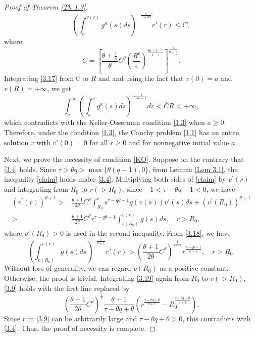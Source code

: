 \documentclass[a4paper,11pt]{amsart}
\theoremstyle{plain}
\theoremstyle{remark}
\numberwithin{equation}{section}
\numberwithin{figure}{section}
\numberwithin{remark}{section}
\begin{document}
\begin{sloppypar}
\begin{proof}[Proof of Theorem \ref{Th 1.3}]
\begin{equation}\label{3.17}
\left( \int_a^{v(r)} g^{\kappa} (s)ds\right)^{-\frac{1}{1+\kappa \theta}} v'(r) \le \bar C,
\end{equation}
where 
$$
\bar C = \left [ \frac{\theta +\frac{1}{\kappa}}{\theta} C^\theta \left (\frac{R^\epsilon}{\epsilon} \right)^{\frac{\theta q +1-\tau}{1-\epsilon}}  \right ]^{\frac{1}{\theta + \frac{1}{\kappa}}}.
$$
Integrating \eqref{3.17}  from $0$ to $R$ and and using the fact that $v(0)=a$ and $v(R)=+\infty$, we get
\begin{equation*}
	\int_{a}^{\infty}\left( \int_{a}^{v}g^{\kappa}(s)ds\right) ^{-\frac{1}{\kappa \theta+1}}dv<\bar C R<+\infty,
\end{equation*}
which contradicts with the Keller-Osserman condition \eqref{1.3} when $a\ge 0$. Therefore, under the condition \eqref{1.3}, the Cauchy problem \eqref{1.1} has an entire solution $v$ with $v'(0)=0$ for all $r\ge 0$ and for nonnegative initial value $a$.

Next, we prove the necessity of condition \eqref{KO}. Suppose on the contrary that \eqref{3.4} holds.
Since $\tau > \theta q > \max \{\theta (q-1), 0\}$, from Lemma \ref{Lem 3.1}, the inequality \eqref{claim} holds under \eqref{3.4}. Multiplying both sides of \eqref{claim} by $v^\prime(r)$ and integrating from $R_0$ to $r (>R_0)$, since $-1<\tau - \theta q -1 <0$, we have
\begin{equation}\label{3.18}
\begin{aligned}
	(v^\prime(r) )^{\theta+1}>&\frac{\theta +1}{2\theta} C^\theta \int_{R_0}^{r} s^{\tau -q\theta -1} g(v(s))v'(s)ds + (v^\prime(R_0) )^{\theta+1}\\
	>&\frac{\theta +1}{2\theta} C^\theta r^{\tau -q\theta -1} \int_{v(R_0)}^{v(r)}  g(s)ds, \quad r>R_0,
\end{aligned}
\end{equation}
where $v'(R_0)>0$ is used in the second inequality.
From \eqref{3.18}, we have
\begin{equation}\label{3.19}
	\left( \int_{v(R_0)}^{v(r)}g(s)ds\right)^{-\frac{1}{\theta+1}} v'(r)>
	\left (\frac{\theta +1}{2\theta} C^\theta\right)^{\frac{1}{\theta +1}} r^{\frac{\tau -q\theta -1}{\theta +1}}, 
	\quad r>R_0.
\end{equation} 
Without loss of generality, we can regard $v(R_0)$ as a positive constant. Otherwise, the proof is trivial. 
Integrating \eqref{3.19} again from $R_0$ to $r(>R_0)$, \eqref{3.9} holds with the first line replaced by
$$
\left ( \frac{\theta +1}{2\theta} C^\theta \right )^{\frac{1}{\theta}}\frac{\theta +1}{\tau - \theta q + \theta}
\left ( r^{\frac{\tau - \theta q +\theta}{\theta +1}} - R_0^{\frac{\tau - \theta q +\theta}{\theta +1}}  \right ).
$$
Since $r$ in \eqref{3.9} can be arbitrarily large and $\tau-\theta q + \theta >0$, this contradicts with \eqref{3.4}. Thus, the proof of necessity is complete.
\end{proof}



\end{sloppypar}
\end{document}
